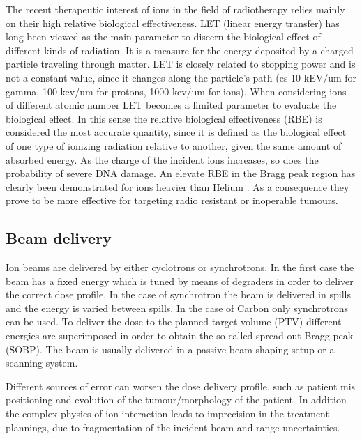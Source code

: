 The recent therapeutic interest of ions in the field of radiotherapy relies mainly on their high relative biological effectiveness.
LET (linear energy transfer) has long been viewed as the main parameter to discern the biological effect of different kinds of radiation. It is a measure for the energy deposited by a charged particle traveling through matter. LET is closely related to stopping power and is not a constant value, since it changes along the particle's path (es 10 kEV/um for gamma, 100 kev/um for protons, 1000 kev/um for ions).
When considering ions of different atomic number LET becomes a limited parameter to evaluate the biological effect. In this sense the relative biological effectiveness (RBE) is considered the most accurate quantity, since it is defined as the biological effect of one type of ionizing radiation relative to another, given the same amount of absorbed energy. As the charge of the incident ions increases, so does the probability of severe DNA damage. An elevate RBE in the Bragg peak region has clearly been demonstrated for ions heavier than Helium \cite{Linz2011}.
As a consequence they prove to be more effective for targeting radio resistant or inoperable tumours.

\subsection{Beam delivery}

Ion beams are delivered by either cyclotrons or synchrotrons. In the first case the beam has a fixed energy which is tuned by means of degraders in order to deliver the correct dose profile. In the case of synchrotron the beam is delivered in spills and the energy is varied between spills. In the case of Carbon only synchrotrons can be used.
To deliver the dose to the planned target volume (PTV) different energies are superimposed in order to obtain the so-called spread-out Bragg peak (SOBP). The beam is usually delivered in a passive beam shaping setup or a scanning system. 

Different sources of error can worsen the dose delivery profile, such as patient mis positioning and evolution of the tumour/morphology of the patient. In addition the complex physics of ion interaction leads to  imprecision in the treatment plannings, due to fragmentation of the incident beam and range uncertainties.

